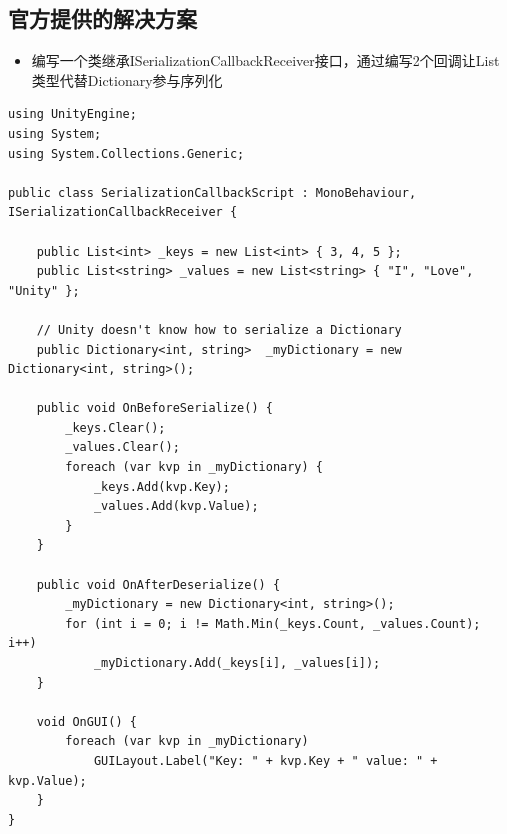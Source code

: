 \documentclass[9pt, b5paper]{article}
\begin{document}
\subsection{官方提供的解决方案}
\label{sec-31-1}
\begin{itemize}
\item 编写一个类继承ISerializationCallbackReceiver接口，通过编写2个回调让List类型代替Dictionary参与序列化
\end{itemize}
\begin{verbatim}
using UnityEngine;
using System;
using System.Collections.Generic;

public class SerializationCallbackScript : MonoBehaviour, ISerializationCallbackReceiver {

    public List<int> _keys = new List<int> { 3, 4, 5 };
    public List<string> _values = new List<string> { "I", "Love", "Unity" };

    // Unity doesn't know how to serialize a Dictionary
    public Dictionary<int, string>  _myDictionary = new Dictionary<int, string>();

    public void OnBeforeSerialize() {
        _keys.Clear();
        _values.Clear();
        foreach (var kvp in _myDictionary) {
            _keys.Add(kvp.Key);
            _values.Add(kvp.Value);
        }
    }

    public void OnAfterDeserialize() {
        _myDictionary = new Dictionary<int, string>();
        for (int i = 0; i != Math.Min(_keys.Count, _values.Count); i++)
            _myDictionary.Add(_keys[i], _values[i]);
    }

    void OnGUI() {
        foreach (var kvp in _myDictionary)
            GUILayout.Label("Key: " + kvp.Key + " value: " + kvp.Value);
    }
}
\end{verbatim}
\end{document}
